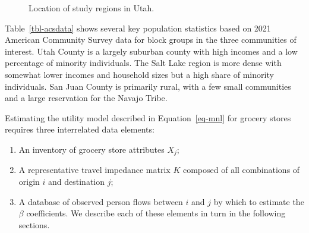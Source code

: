 \documentclass[
  letterpaper,
  number,
  review,
  doubleblind,
  3p]{elsarticle}
\providecommand{\tightlist}{%
  \setlength{\itemsep}{0pt}\setlength{\parskip}{0pt}}\usepackage{longtable,booktabs,array}
\begin{document}
\begin{figure}


\caption{\label{fig-communities}Location of study regions in Utah.}

\end{figure}%

Table~\ref{tbl-acsdata} shows several key population statistics based on
2021 American Community Survey data for block groups in the three
communities of interest. Utah County is a largely suburban county with
high incomes and a low percentage of minority individuals. The Salt Lake
region is more dense with somewhat lower incomes and household sizes but
a high share of minority individuals. San Juan County is primarily
rural, with a few small communities and a large reservation for the
Navajo Tribe.

\begin{table}

\caption{\label{tbl-acsdata}Demographic Statistics of Study Regions}


\end{table}%

Estimating the utility model described in Equation~\ref{eq-mnl} for
grocery stores requires three interrelated data elements:

\begin{enumerate}
\def\labelenumi{\arabic{enumi}.}
\tightlist
\item
  An inventory of grocery store attributes \(X_j\);
\item
  A representative travel impedance matrix \(K\) composed of all
  combinations of origin \(i\) and destination \(j\);
\item
  A database of observed person flows between \(i\) and \(j\) by which
  to estimate the \(\beta\) coefficients. We describe each of these
  elements in turn in the following sections.
\end{enumerate}
\end{document}
